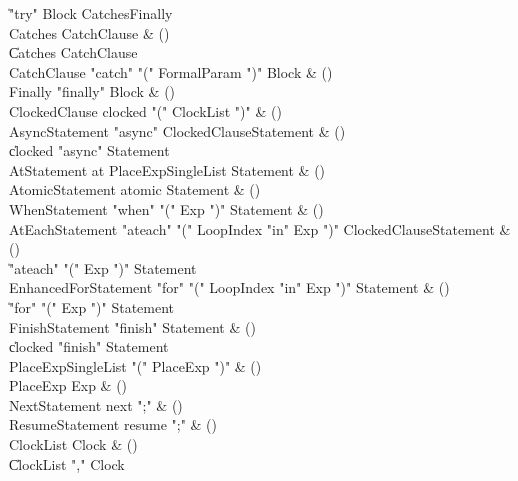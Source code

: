\begin{bbgrammar}
    \| \xcd"try" Block Catches\opt Finally\\
 Catches  \label{prod:Catches}  \: CatchClause & ()\\
    \| Catches CatchClause\\
 CatchClause  \label{prod:CatchClause}  \: \xcd"catch" \xcd"(" FormalParam \xcd")" Block & ()\\
 Finally  \label{prod:Finally}  \: \xcd"finally" Block & ()\\
 ClockedClause  \label{prod:ClockedClause}  \: clocked \xcd"(" ClockList \xcd")" & ()\\
 AsyncStatement  \label{prod:AsyncStatement}  \: \xcd"async" ClockedClause\opt Statement & ()\\
    \| clocked \xcd"async" Statement\\
 AtStatement  \label{prod:AtStatement}  \: at PlaceExpSingleList Statement & ()\\
 AtomicStatement  \label{prod:AtomicStatement}  \: atomic Statement & ()\\
 WhenStatement  \label{prod:WhenStatement}  \: \xcd"when" \xcd"(" Exp \xcd")" Statement & ()\\
 AtEachStatement  \label{prod:AtEachStatement}  \: \xcd"ateach" \xcd"(" LoopIndex \xcd"in" Exp \xcd")" ClockedClause\opt Statement & ()\\
    \| \xcd"ateach" \xcd"(" Exp \xcd")" Statement\\
 EnhancedForStatement  \label{prod:EnhancedForStatement}  \: \xcd"for" \xcd"(" LoopIndex \xcd"in" Exp \xcd")" Statement & ()\\
    \| \xcd"for" \xcd"(" Exp \xcd")" Statement\\
 FinishStatement  \label{prod:FinishStatement}  \: \xcd"finish" Statement & ()\\
    \| clocked \xcd"finish" Statement\\
 PlaceExpSingleList  \label{prod:PlaceExpSingleList}  \: \xcd"(" PlaceExp \xcd")" & ()\\
 PlaceExp  \label{prod:PlaceExp}  \: Exp & ()\\
 NextStatement  \label{prod:NextStatement}  \: next \xcd";" & ()\\
 ResumeStatement  \label{prod:ResumeStatement}  \: resume \xcd";" & ()\\
 ClockList  \label{prod:ClockList}  \: Clock & ()\\
    \| ClockList \xcd"," Clock\\
\end{bbgrammar}

